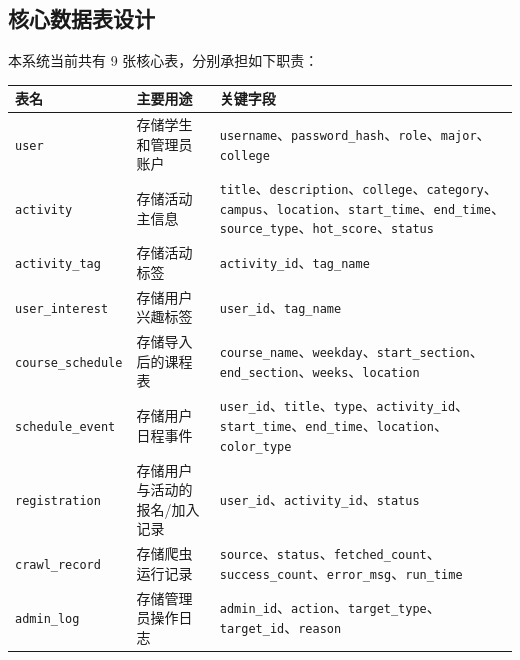 \documentclass[UTF8,a4paper,12pt,fontset=none]{ctexrep}
\newcounter{none}
\begin{document}
\subsection{核心数据表设计}\label{ux6838ux5fc3ux6570ux636eux8868ux8bbeux8ba1}

本系统当前共有 9 张核心表，分别承担如下职责：

{\def\LTcaptype{none} %
\begin{longtable}[]{@{}
  >{\raggedright\arraybackslash}p{}
  >{\raggedright\arraybackslash}p{}
  >{\raggedright\arraybackslash}p{}@{}}
\toprule\noalign{}
\begin{minipage}[b]{\linewidth}\raggedright
表名
\end{minipage} & \begin{minipage}[b]{\linewidth}\raggedright
主要用途
\end{minipage} & \begin{minipage}[b]{\linewidth}\raggedright
关键字段
\end{minipage} \\
\midrule\noalign{}
\endhead
\bottomrule\noalign{}
\endlastfoot
\texttt{user} & 存储学生和管理员账户 & \texttt{username}、\texttt{password\_hash}、\texttt{role}、\texttt{major}、\texttt{college} \\
\texttt{activity} & 存储活动主信息 & \texttt{title}、\texttt{description}、\texttt{college}、\texttt{category}、\texttt{campus}、\texttt{location}、\texttt{start\_time}、\texttt{end\_time}、\texttt{source\_type}、\texttt{hot\_score}、\texttt{status} \\
\texttt{activity\_tag} & 存储活动标签 & \texttt{activity\_id}、\texttt{tag\_name} \\
\texttt{user\_interest} & 存储用户兴趣标签 & \texttt{user\_id}、\texttt{tag\_name} \\
\texttt{course\_schedule} & 存储导入后的课程表 & \texttt{course\_name}、\texttt{weekday}、\texttt{start\_section}、\texttt{end\_section}、\texttt{weeks}、\texttt{location} \\
\texttt{schedule\_event} & 存储用户日程事件 & \texttt{user\_id}、\texttt{title}、\texttt{type}、\texttt{activity\_id}、\texttt{start\_time}、\texttt{end\_time}、\texttt{location}、\texttt{color\_type} \\
\texttt{registration} & 存储用户与活动的报名/加入记录 & \texttt{user\_id}、\texttt{activity\_id}、\texttt{status} \\
\texttt{crawl\_record} & 存储爬虫运行记录 & \texttt{source}、\texttt{status}、\texttt{fetched\_count}、\texttt{success\_count}、\texttt{error\_msg}、\texttt{run\_time} \\
\texttt{admin\_log} & 存储管理员操作日志 & \texttt{admin\_id}、\texttt{action}、\texttt{target\_type}、\texttt{target\_id}、\texttt{reason} \\
\end{longtable}
}
\end{document}
